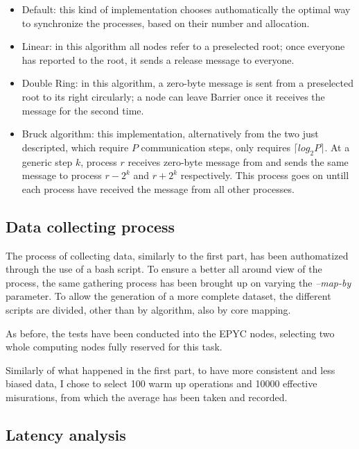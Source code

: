 \documentclass{article}
\begin{document}
	\begin{itemize}
		\item Default: this kind of implementation chooses authomatically the optimal way to synchronize the processes, based on their number and allocation.\\
		\item Linear: in this algorithm all nodes refer to a preselected root; once everyone has reported to the root, it sends a release message to everyone.\\
		\item Double Ring: in this algorithm, a zero-byte message is sent from a preselected root to its right circularly; a node can leave Barrier once it receives the message for the second time.\\
		\item Bruck algorithm: this implementation, alternatively from the two just descripted, which require $P$ communication steps, only requires $\lceil log_2P \rceil$. At a generic step $k$, process $r$ receives zero-byte message from and sends the same message to process $r - 2^k$ and $r + 2^k$ respectively. This process goes on untill each process have received the message from all other processes.
	\end{itemize}
	
	\subsection{Data collecting process}
	
	The process of collecting data, similarly to the first part, has been authomatized through the use of a bash script. To ensure a better all around view of the process, the same gathering process has been brought up on varying the \textit{--map-by} parameter. To allow the generation of a more complete dataset, the different scripts are divided, other than by algorithm, also by core mapping.
	
	As before, the tests have been conducted into the EPYC nodes, selecting two whole computing nodes fully reserved for this task.
	
	Similarly of what happened in the first part, to have more consistent and less biased data, I chose to select 100 warm up operations and 10000 effective misurations, from which the average has been taken and recorded.
	
	\subsection{Latency analysis}
	
\end{document}
